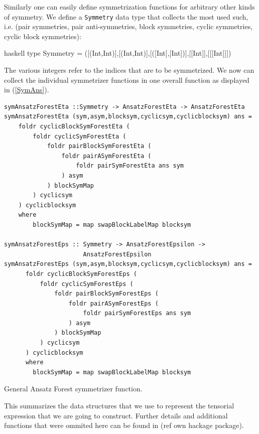 \documentclass[a4paper,12pt, DIV=14, BCOR=5mm, twoside, headsepline, numbers=noenddot]{scrbook}
\begin{document}
Similarly one can easily define symmetrization functions for arbitrary other kinds of symmetry. We define a \texttt{Symmetry} data type that collects the most used such, i.e. (pair symmetries, pair anti-symmetries, block symmetries, cyclic symmetries, cyclic block symmetries):
\begin{center}
\begin{cminted}{haskell}
type Symmetry = ([(Int,Int)],[(Int,Int)],[([Int],[Int])],[[Int]],[[[Int]]])
\end{cminted}
\end{center}
The various integers refer to the indices that are to be symmetrized. We now can collect the individual symmetrizer functions in one overall function as displayed in (\ref{SymAns}).
\begin{listing}[hbt!] 
\begin{verbatim}
symAnsatzForestEta ::Symmetry -> AnsatzForestEta -> AnsatzForestEta
symAnsatzForestEta (sym,asym,blocksym,cyclicsym,cyclicblocksym) ans =
    foldr cyclicBlockSymForestEta (
        foldr cyclicSymForestEta (
            foldr pairBlockSymForestEta (
                foldr pairASymForestEta (
                    foldr pairSymForestEta ans sym
                ) asym
            ) blockSymMap
        ) cyclicsym
    ) cyclicblocksym
    where
        blockSymMap = map swapBlockLabelMap blocksym

symAnsatzForestEps :: Symmetry -> AnsatzForestEpsilon ->
                      AnsatzForestEpsilon
symAnsatzForestEps (sym,asym,blocksym,cyclicsym,cyclicblocksym) ans =
      foldr cyclicBlockSymForestEps (
          foldr cyclicSymForestEps (
              foldr pairBlockSymForestEps (
                  foldr pairASymForestEps (
                      foldr pairSymForestEps ans sym
                  ) asym
              ) blockSymMap
          ) cyclicsym
      ) cyclicblocksym
      where
        blockSymMap = map swapBlockLabelMap blocksym
\end{verbatim} 
\caption{General Ansatz Forest symmetrizer function.}\label{SymAns}
\end{listing}

This summarizes the data structures that we use to represent the tensorial expression that we are going to construct. Further details and additional functions that were ommited here can be found in (ref own hackage package).  \\
\end{document}
